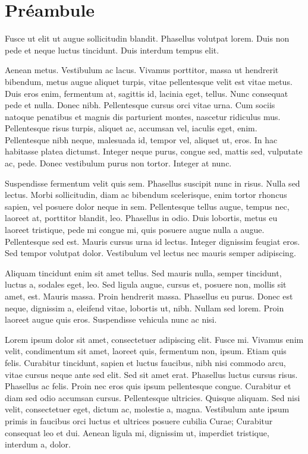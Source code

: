 \chapter*{Préambule}

\vspace*{\fill} 
\begin{center} \begin{minipage}{.8\textwidth} \begin{mdframed}
Fusce ut elit ut augue sollicitudin blandit. Phasellus volutpat lorem. Duis non
pede et neque luctus tincidunt. Duis interdum tempus elit.

Aenean metus. Vestibulum ac lacus. Vivamus porttitor, massa ut hendrerit
bibendum, metus augue aliquet turpis, vitae pellentesque velit est vitae metus.
Duis eros enim, fermentum at, sagittis id, lacinia eget, tellus. Nunc consequat
pede et nulla. Donec nibh. Pellentesque cursus orci vitae urna. Cum sociis
natoque penatibus et magnis dis parturient montes, nascetur ridiculus mus.
Pellentesque risus turpis, aliquet ac, accumsan vel, iaculis eget, enim.
Pellentesque nibh neque, malesuada id, tempor vel, aliquet ut, eros. In hac
habitasse platea dictumst. Integer neque purus, congue sed, mattis sed,
vulputate ac, pede. Donec vestibulum purus non tortor. Integer at nunc.

Suspendisse fermentum velit quis sem. Phasellus suscipit nunc in risus. Nulla
sed lectus. Morbi sollicitudin, diam ac bibendum scelerisque, enim tortor
rhoncus sapien, vel posuere dolor neque in sem. Pellentesque tellus augue,
tempus nec, laoreet at, porttitor blandit, leo. Phasellus in odio. Duis
lobortis, metus eu laoreet tristique, pede mi congue mi, quis posuere augue
nulla a augue. Pellentesque sed est. Mauris cursus urna id lectus. Integer
dignissim feugiat eros. Sed tempor volutpat dolor. Vestibulum vel lectus nec
mauris semper adipiscing.

Aliquam tincidunt enim sit amet tellus. Sed mauris nulla, semper tincidunt,
luctus a, sodales eget, leo. Sed ligula augue, cursus et, posuere non, mollis
sit amet, est. Mauris massa. Proin hendrerit massa. Phasellus eu purus. Donec
est neque, dignissim a, eleifend vitae, lobortis ut, nibh. Nullam sed lorem.
Proin laoreet augue quis eros. Suspendisse vehicula nunc ac nisi.

Lorem ipsum dolor sit amet, consectetuer adipiscing elit. Fusce mi. Vivamus enim
velit, condimentum sit amet, laoreet quis, fermentum non, ipsum. Etiam quis
felis. Curabitur tincidunt, sapien et luctus faucibus, nibh nisi commodo arcu,
vitae cursus neque ante sed elit. Sed sit amet erat. Phasellus luctus cursus
risus. Phasellus ac felis. Proin nec eros quis ipsum pellentesque congue.
Curabitur et diam sed odio accumsan cursus. Pellentesque ultricies. Quisque
aliquam. Sed nisi velit, consectetuer eget, dictum ac, molestie a, magna.
Vestibulum ante ipsum primis in faucibus orci luctus et ultrices posuere cubilia
Curae; Curabitur consequat leo et dui. Aenean ligula mi, dignissim ut, imperdiet
tristique, interdum a, dolor.


\end{mdframed}
\end{minipage}
\end{center}
